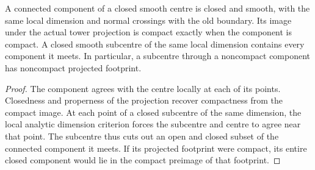 \begin{proposition}
\label{hir:g8-centre-component-compactness}
\leanok
A connected component of a closed smooth centre is closed and smooth,
with the same local dimension and normal crossings with the old
boundary. Its image under the actual tower projection is compact
exactly when the component is compact. A closed smooth subcentre of
the same local dimension contains every component it meets. In
particular, a subcentre through a noncompact component has noncompact
projected footprint.
\end{proposition}
\begin{proof}
The component agrees with the centre locally at each of its points.
Closedness and properness of the projection recover compactness from
the compact image. At each point of a closed subcentre of the same
dimension, the local analytic dimension criterion forces the
subcentre and centre to agree near that point. The subcentre thus cuts
out an open and closed subset of the connected component it meets.
If its projected footprint were compact, its entire closed component
would lie in the compact preimage of that footprint.
\end{proof}

